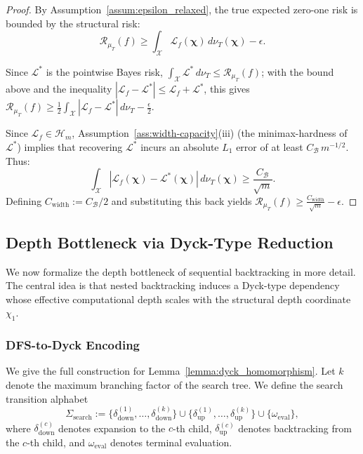 \begin{proof}
By Assumption~\ref{assum:epsilon_relaxed}, the true expected zero-one risk is bounded by the structural risk:
\begin{equation}
\mathcal{R}_{\mu_T}(f) \ge \int_{\mathcal{X}} \mathcal{L}_f(\boldsymbol{\chi}) \,d\nu_T(\boldsymbol{\chi}) - \epsilon.
\end{equation}

Since $\mathcal{L}^*$ is the pointwise Bayes risk, $\int_{\mathcal{X}}\mathcal{L}^*\,d\nu_T\le\mathcal{R}_{\mu_T}(f)$; with the bound above and the inequality $|\mathcal{L}_f-\mathcal{L}^*|\le\mathcal{L}_f+\mathcal{L}^*$, this gives $\mathcal{R}_{\mu_T}(f)\ge\frac12\int_{\mathcal{X}}|\mathcal{L}_f-\mathcal{L}^*|\,d\nu_T-\frac{\epsilon}{2}$.

Since $\mathcal{L}_f \in \mathcal{H}_m$, Assumption~\ref{ass:width-capacity}(iii) (the minimax-hardness of $\mathcal{L}^*$) implies that recovering $\mathcal{L}^*$ incurs an absolute $L_1$ error of at least $C_{\mathcal{B}}\, m^{-1/2}$. %
 Thus:
\begin{equation}
\int_{\mathcal{X}} \left| \mathcal{L}_f(\boldsymbol{\chi}) - \mathcal{L}^*(\boldsymbol{\chi}) \right| \,d\nu_T(\boldsymbol{\chi}) \ge \frac{C_{\mathcal{B}}}{\sqrt{m}}.
\end{equation}
Defining $C_{\mathrm{width}} := C_{\mathcal{B}}/2$ and substituting this back yields $\mathcal{R}_{\mu_T}(f) \ge \frac{C_{\mathrm{width}}}{\sqrt{m}} - \epsilon$.
\end{proof}

\subsection{Depth Bottleneck via Dyck-Type Reduction}
\label{app:depth-bound}

We now formalize the depth bottleneck of sequential backtracking in more detail. The central idea is that nested backtracking induces a Dyck-type dependency whose effective computational depth scales with the structural depth coordinate $\chi_1$.

\subsubsection{DFS-to-Dyck Encoding}
\label{app:dfs-dyck}

We give the full construction for Lemma~\ref{lemma:dyck_homomorphism}. Let $k$ denote the maximum branching factor of the search tree. We define the search transition alphabet
\begin{equation}
\Sigma_{\mathrm{search}}
:=
\{\delta_{\mathrm{down}}^{(1)},\dots,\delta_{\mathrm{down}}^{(k)}\}
\cup
\{\delta_{\mathrm{up}}^{(1)},\dots,\delta_{\mathrm{up}}^{(k)}\}
\cup
\{\omega_{\mathrm{eval}}\},
\end{equation}
where $\delta_{\mathrm{down}}^{(c)}$ denotes expansion to the $c$-th child, $\delta_{\mathrm{up}}^{(c)}$ denotes backtracking from the $c$-th child, and $\omega_{\mathrm{eval}}$ denotes terminal evaluation.

